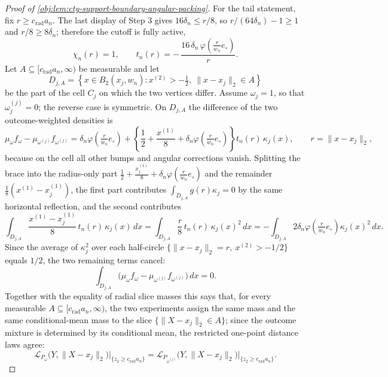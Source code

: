 \documentclass[11pt]{article}
\begin{document}
\begin{proof}[Proof of \cref{obj:lem:cty-support-boundary-angular-packing}]
For the tail statement, fix \(r\ge c_{\mathrm{rad}}a_n\).  The last display of Step 3 gives \(16\delta_n\le r/8\), so \(r/(64\delta_n)-1\ge1\) and \(r/8\ge8\delta_n\); therefore the cutoff is fully active,
\[
\chi_n(r)=1,
\qquad
t_n(r)=-\,\frac{16\,\delta_n\,\varphi\!\left(\tfrac{r}{w_n}e_\circ\right)}{r} .
\]
Let \(A\subseteq[c_{\mathrm{rad}}a_n,\infty)\) be measurable and let
\[
D_{j,A}=\left\{x\in B_2(x_j,w_n):x^{(2)}>-\tfrac12,\ \lVert x-x_j\rVert_2\in A\right\}
\]
be the part of the cell \(C_j\) on which the two vertices differ.  Assume \(\omega_j=1\), so that \(\omega^{(j)}_j=0\); the reverse case is symmetric.  On \(D_{j,A}\) the difference of the two outcome-weighted densities is
\[
\mu_\omega f_\omega-\mu_{\omega^{(j)}}f_{\omega^{(j)}}
=
\delta_n\varphi\!\left(\tfrac{r}{w_n}e_\circ\right)
+
\left\{\frac12+\frac{x^{(1)}}{8}+\delta_n\varphi\!\left(\tfrac{r}{w_n}e_\circ\right)\right\}
t_n(r)\,\kappa_j(x),
\qquad r=\lVert x-x_j\rVert_2 ,
\]
because on the cell all other bumps and angular corrections vanish.
Splitting the brace into the radius-only part \(\tfrac12+\tfrac{x_j^{(1)}}{8}+\delta_n\varphi(\tfrac{r}{w_n}e_\circ)\) and the remainder \(\tfrac18(x^{(1)}-x_j^{(1)})\), the first part contributes \(\int_{D_{j,A}}g(r)\kappa_j=0\) by the same horizontal reflection, and the second contributes
\[
\int_{D_{j,A}}\frac{x^{(1)}-x_j^{(1)}}{8}\,t_n(r)\,\kappa_j(x)\,dx
=
\int_{D_{j,A}}\frac{r}{8}\,t_n(r)\,\kappa_j(x)^2\,dx
=
-\int_{D_{j,A}}2\delta_n\varphi\!\left(\tfrac{r}{w_n}e_\circ\right)\kappa_j(x)^2\,dx .
\]
Since the average of \(\kappa_j^2\) over each half-circle \(\{\lVert x-x_j\rVert_2=r,\ x^{(2)}>-1/2\}\) equals \(1/2\), the two remaining terms cancel:
\[
\int_{D_{j,A}}\bigl(\mu_\omega f_\omega-\mu_{\omega^{(j)}}f_{\omega^{(j)}}\bigr)\,dx=0 .
\]
Together with the equality of radial slice masses this says that, for every measurable \(A\subseteq[c_{\mathrm{rad}}a_n,\infty)\), the two experiments assign the same mass and the same conditional-mean mass to the slice \(\{\lVert X-x_j\rVert_2\in A\}\); since the outcome mixture is determined by its conditional mean, the restricted one-point distance laws agree:
\[
\mathcal L_{P_\omega}\bigl(Y,\lVert X-x_j\rVert_2\bigr)\Big|_{\{z_2\ge c_{\mathrm{rad}}a_n\}}
=
\mathcal L_{P_{\omega^{(j)}}}\bigl(Y,\lVert X-x_j\rVert_2\bigr)\Big|_{\{z_2\ge c_{\mathrm{rad}}a_n\}} .
\]


\end{proof}
\end{document}
